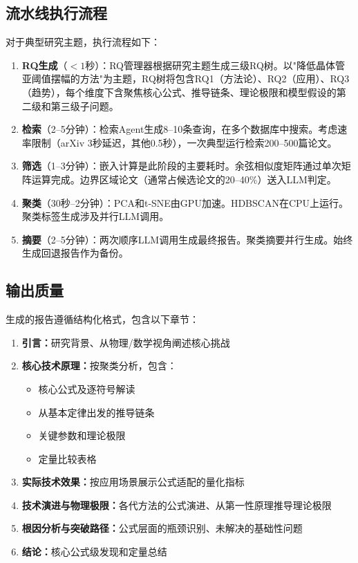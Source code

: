 \subsection{流水线执行流程}

对于典型研究主题，执行流程如下：

\begin{enumerate}
    \item \textbf{RQ生成}（$<1$秒）：RQ管理器根据研究主题生成三级RQ树。以"降低晶体管亚阈值摆幅的方法"为主题，RQ树将包含RQ1（方法论）、RQ2（应用）、RQ3（趋势），每个维度下含聚焦核心公式、推导链条、理论极限和模型假设的第二级和第三级子问题。

    \item \textbf{检索}（2--5分钟）：检索Agent生成8--10条查询，在多个数据库中搜索。考虑速率限制（arXiv 3秒延迟，其他0.5秒），一次典型运行检索200--500篇论文。

    \item \textbf{筛选}（1--3分钟）：嵌入计算是此阶段的主要耗时。余弦相似度矩阵通过单次矩阵运算完成。边界区域论文（通常占候选论文的20--40\%）送入LLM判定。

    \item \textbf{聚类}（30秒--2分钟）：PCA和t-SNE由GPU加速。HDBSCAN在CPU上运行。聚类标签生成涉及并行LLM调用。

    \item \textbf{摘要}（2--5分钟）：两次顺序LLM调用生成最终报告。聚类摘要并行生成。始终生成回退报告作为备份。
\end{enumerate}

\subsection{输出质量}

生成的报告遵循结构化格式，包含以下章节：
\begin{enumerate}
    \item \textbf{引言：}研究背景、从物理/数学视角阐述核心挑战
    \item \textbf{核心技术原理：}按聚类分析，包含：
    \begin{itemize}
        \item 核心公式及逐符号解读
        \item 从基本定律出发的推导链条
        \item 关键参数和理论极限
        \item 定量比较表格
    \end{itemize}
    \item \textbf{实际技术效果：}按应用场景展示公式适配的量化指标
    \item \textbf{技术演进与物理极限：}各代方法的公式演进、从第一性原理推导理论极限
    \item \textbf{根因分析与突破路径：}公式层面的瓶颈识别、未解决的基础性问题
    \item \textbf{结论：}核心公式级发现和定量总结
\end{enumerate}

